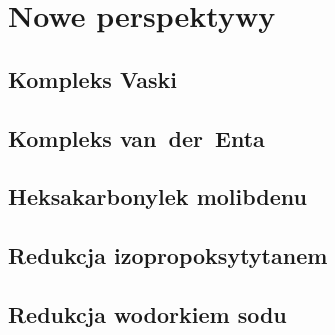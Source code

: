 \section{Nowe perspektywy}\label{literature:new}
\subsection{Kompleks Vaski}\label{literature:new:vasca}
\subsection{Kompleks van~der~Enta}\label{literature:new:van-der-ent}
\subsection{Heksakarbonylek molibdenu}\label{literature:new:molydenium}
\subsection{Redukcja izopropoksytytanem}\label{literature:new:titanium}
\subsection{Redukcja wodorkiem sodu}\label{literature:new:sodium-hydride}
